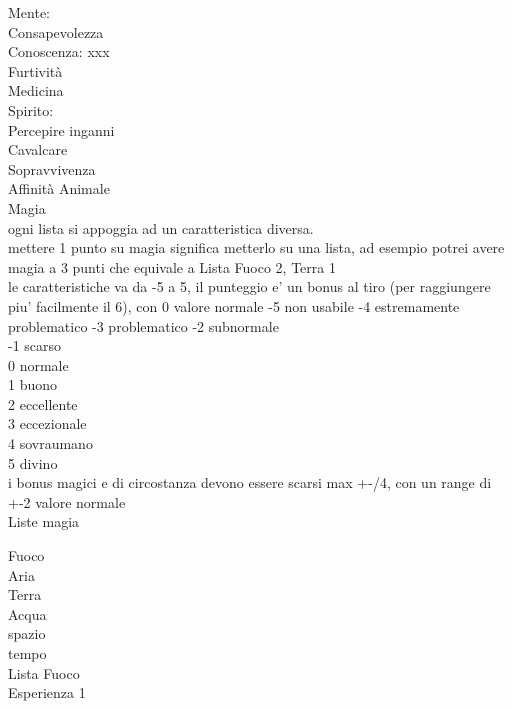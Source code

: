 \documentclass[12pt,a4paper]{book}
\begin{document}
Mente:\\
Consapevolezza\\
Conoscenza: xxx\\
Furtività\\
Medicina\\

Spirito:\\
Percepire inganni\\
Cavalcare\\
Sopravvivenza\\
Affinità Animale\\

Magia\\
ogni lista si appoggia ad un caratteristica diversa.\\
mettere 1 punto su magia significa metterlo su una lista, ad esempio potrei avere magia a 3 punti che equivale a Lista Fuoco 2, Terra 1\\

le caratteristiche va da -5 a 5, il punteggio e' un bonus al tiro (per raggiungere piu' facilmente il 6), con 0 valore normale
-5 non usabile
-4 estremamente problematico
-3 problematico
-2 subnormale\\
-1 scarso\\
0 normale\\
1 buono\\
2 eccellente\\
3 eccezionale\\
4 sovraumano\\
5 divino\\

i bonus magici e di circostanza devono essere scarsi max +-/4, con un range di +-2 valore normale\\

Liste magia

Fuoco\\
Aria\\
Terra \\
Acqua\\
spazio\\
tempo\\

Lista Fuoco\\

Esperienza 1\\
\end{document}
